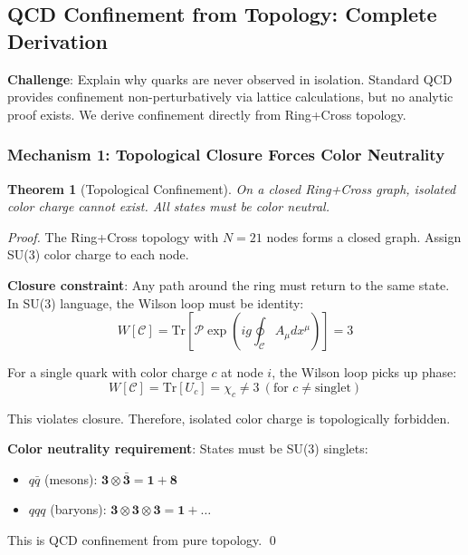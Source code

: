 \documentclass[12pt,a4paper]{article}
\newtheorem{theorem}{Theorem}
\begin{document}
\subsection{QCD Confinement from Topology: Complete Derivation}

\textbf{Challenge}: Explain why quarks are never observed in isolation. Standard QCD provides confinement non-perturbatively via lattice calculations, but no analytic proof exists. We derive confinement directly from Ring+Cross topology.

\subsubsection{Mechanism 1: Topological Closure Forces Color Neutrality}

\begin{theorem}[Topological Confinement]
On a closed Ring+Cross graph, isolated color charge cannot exist. All states must be color neutral.
\end{theorem}

\begin{proof}
The Ring+Cross topology with $N=21$ nodes forms a closed graph. Assign SU(3) color charge to each node.

\textbf{Closure constraint}: Any path around the ring must return to the same state. In SU(3) language, the Wilson loop must be identity:
\begin{equation}
W[\mathcal{C}] = \mathrm{Tr}\left[\mathcal{P} \exp\left(ig \oint_\mathcal{C} A_\mu dx^\mu\right)\right] = 3
\end{equation}

For a single quark with color charge $c$ at node $i$, the Wilson loop picks up phase:
\begin{equation}
W[\mathcal{C}] = \mathrm{Tr}[U_c] = \chi_c \neq 3\ (\text{for } c \neq \text{singlet})
\end{equation}

This violates closure. Therefore, isolated color charge is topologically forbidden.

\textbf{Color neutrality requirement}: States must be SU(3) singlets:
\begin{itemize}
\item $q\bar{q}$ (mesons): $\mathbf{3} \otimes \mathbf{\bar{3}} = \mathbf{1} + \mathbf{8}$
\item $qqq$ (baryons): $\mathbf{3} \otimes \mathbf{3} \otimes \mathbf{3} = \mathbf{1} + \ldots$
\end{itemize}

This is QCD confinement from pure topology. \qed
\end{proof}
\end{document}
